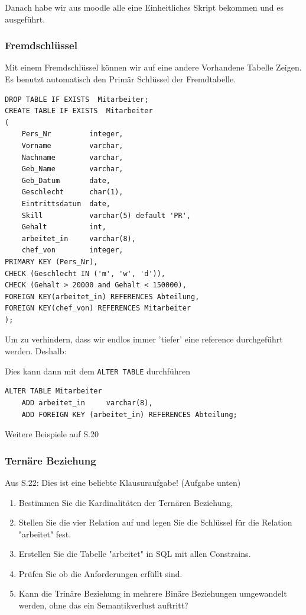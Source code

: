 \documentclass[a4paper]{article}
\begin{document}
Danach habe wir aus moodle alle eine Einheitliches Skript bekommen und es ausgeführt.

\subsubsection{Fremdschlüssel}

Mit einem Fremdschlüssel können wir auf eine andere Vorhandene Tabelle Zeigen. Es benutzt automatisch den Primär Schlüssel der Fremdtabelle.

\begin{lstlisting}
DROP TABLE IF EXISTS  Mitarbeiter;
CREATE TABLE IF EXISTS  Mitarbeiter
(
    Pers_Nr         integer,
    Vorname         varchar,
    Nachname        varchar,
    Geb_Name        varchar,
    Geb_Datum       date,
    Geschlecht      char(1),
    Eintrittsdatum  date,
	Skill			varchar(5) default 'PR',
	Gehalt			int,
	arbeitet_in		varchar(8),
	chef_von		integer,
PRIMARY KEY (Pers_Nr),
CHECK (Geschlecht IN ('m', 'w', 'd')),
CHECK (Gehalt > 20000 and Gehalt < 150000),
FOREIGN KEY(arbeitet_in) REFERENCES Abteilung,
FOREIGN KEY(chef_von) REFERENCES Mitarbeiter
);
\end{lstlisting}

Um zu verhindern, dass wir endlos immer 'tiefer' eine reference durchgeführt werden. Deshalb:


Dies kann dann mit dem \lstinline|ALTER TABLE| durchführen

\begin{lstlisting}
ALTER TABLE Mitarbeiter
    ADD arbeitet_in     varchar(8),
    ADD FOREIGN KEY (arbeitet_in) REFERENCES Abteilung;
\end{lstlisting}

Weitere Beispiele auf S.20


\subsubsection{Ternäre Beziehung}

Aus S.22: Dies ist eine beliebte Klausuraufgabe! (Aufgabe unten)

\begin{enumerate}
    \item Bestimmen Sie die Kardinalitäten der Ternären Beziehung,
    \item Stellen Sie die vier Relation auf und legen Sie die Schlüssel für die Relation "arbeitet" fest.
    \item Erstellen Sie die Tabelle "arbeitet" in SQL mit allen Constrains.
    \item Prüfen Sie ob die Anforderungen erfüllt sind.
    \item Kann die Trinäre Beziehung in mehrere Binäre Beziehungen umgewandelt werden, ohne das ein Semantikverlust auftritt?
\end{enumerate}
\end{document}
